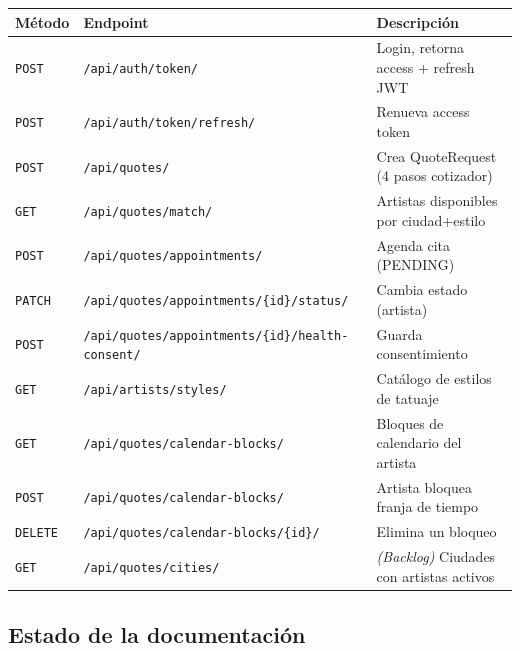 \documentclass[11pt,a4paper]{article}
\begin{document}
\begin{center}
\begin{tabularx}{\textwidth}{llX}
\toprule
\rowcolor{blkMid}
\textcolor{blkGold}{\textbf{Método}} &
\textcolor{blkGold}{\textbf{Endpoint}} &
\textcolor{blkGold}{\textbf{Descripción}}\\
\midrule
\texttt{POST} & \texttt{/api/auth/token/} & Login, retorna access + refresh JWT\\
\rowcolor{blkMid}
\texttt{POST} & \texttt{/api/auth/token/refresh/} & Renueva access token\\
\texttt{POST} & \texttt{/api/quotes/} & Crea QuoteRequest (4 pasos cotizador)\\
\rowcolor{blkMid}
\texttt{GET}  & \texttt{/api/quotes/match/} & Artistas disponibles por ciudad+estilo\\
\texttt{POST} & \texttt{/api/quotes/appointments/} & Agenda cita (PENDING)\\
\rowcolor{blkMid}
\texttt{PATCH}& \texttt{/api/quotes/appointments/\{id\}/status/} & Cambia estado (artista)\\
\texttt{POST} & \texttt{/api/quotes/appointments/\{id\}/health-consent/} & Guarda consentimiento\\
\rowcolor{blkMid}
\texttt{GET}  & \texttt{/api/artists/styles/} & Catálogo de estilos de tatuaje\\
\rowcolor{blkMid}
\texttt{GET}  & \texttt{/api/quotes/calendar-blocks/} & Bloques de calendario del artista\\
\texttt{POST} & \texttt{/api/quotes/calendar-blocks/} & Artista bloquea franja de tiempo\\
\rowcolor{blkMid}
\texttt{DELETE}& \texttt{/api/quotes/calendar-blocks/\{id\}/} & Elimina un bloqueo\\
\texttt{GET}  & \texttt{/api/quotes/cities/} & \textit{(Backlog)} Ciudades con artistas activos\\
\bottomrule
\end{tabularx}
\end{center}

\vspace{1.5cm}

\subsection*{Estado de la documentación}
\end{document}

